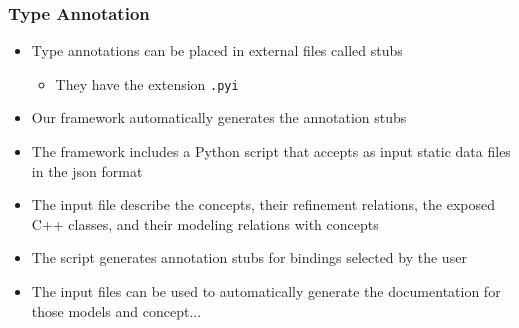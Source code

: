 \begin{frame}
  \frametitle{Type Annotation}
  \begin{itemize}
  \item Type annotations can be placed in external files called stubs
    \begin{itemize}
    \item They have the extension \lstinline{.pyi}
    \end{itemize}
  \item Our framework automatically generates the annotation stubs
  \item The framework includes a Python script that accepts as input static
    data files in the json format
  \item The input file describe the concepts, their refinement relations,
    the exposed C++ classes, and their modeling relations with concepts
  \item The script generates annotation stubs for bindings selected by
    the user
  \item The input files can be used to automatically generate the
    documentation for those models and concept...
  \end{itemize}
\end{frame}
